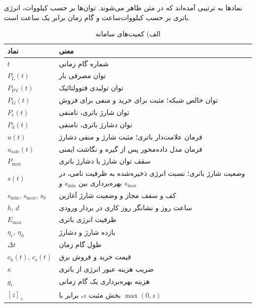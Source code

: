 
نمادها به ترتیبی آمده‌اند که در متن ظاهر می‌شوند. توان‌ها بر حسب کیلووات، انرژی باتری بر حسب کیلووات‌ساعت و گام زمان برابر یک ساعت است.

\begin{table}[H]
  \centering
  \caption*{الف) کمیت‌های سامانه}
  \begin{tabular}{>{\centering\arraybackslash}p{} p{}}
    \toprule
    \textbf{نماد} & \textbf{معنی} \\
    \midrule
    $t$ & شماره گام زمانی \\
    $P_{\mathrm{L}}(t)$ & توان مصرفی بار \\
    $P_{\mathrm{PV}}(t)$ & توان تولیدی فتوولتائیک \\
    $P_{\mathrm{G}}(t)$ & توان خالص شبکه؛ مثبت برای خرید و منفی برای فروش \\
    $P_{\mathrm{c}}(t)$ & توان شارژ باتری، نامنفی \\
    $P_{\mathrm{d}}(t)$ & توان دشارژ باتری، نامنفی \\
    $u(t)$ & فرمان علامت‌دار باتری؛ مثبت شارژ و منفی دشارژ \\
    $u_{\mathrm{safe}}(t)$ & فرمان مدل داده‌محور پس از گیره و نگاشت ایمنی \\
    $P_{\max}$ & سقف توان شارژ یا دشارژ باتری \\
    $s(t)$ & وضعیت شارژ باتری؛ نسبت انرژی ذخیره‌شده به ظرفیت نامی، در بهره‌برداری بین $s_{\min}$ و $s_{\max}$ \\
    $s_{\min},\,s_{\max},\,s_{0}$ & کف و سقف مجاز و وضعیت شارژ آغازین \\
    $h,\,d$ & ساعت روز و نشانگر روز کاری در بردار ورودی \\
    $E_{\max}$ & ظرفیت انرژی باتری \\
    $\eta_{\mathrm{c}},\,\eta_{\mathrm{d}}$ & بازده شارژ و دشارژ \\
    $\Delta t$ & طول گام زمان \\
    $c_{\mathrm{b}}(t),\,c_{\mathrm{s}}(t)$ & قیمت خرید و فروش برق \\
    $\kappa$ & ضریب هزینه عبور انرژی از باتری \\
    $g_{t}$ & هزینه بهره‌برداری یک گام زمانی \\
    $[z]_{+}$ & بخش مثبت $z$، برابر با $\max(0,z)$ \\
    \bottomrule
  \end{tabular}
\end{table}

